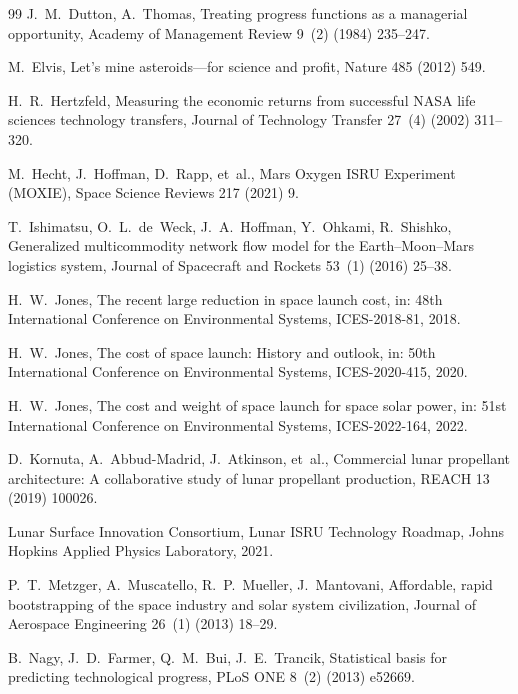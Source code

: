 \documentclass[preprint,12pt]{elsarticle}
\begin{document}
\begin{thebibliography}{99}
J.~M.~Dutton, A.~Thomas,
\newblock Treating progress functions as a managerial opportunity,
\newblock Academy of Management Review 9~(2) (1984) 235--247.

M.~Elvis,
\newblock Let's mine asteroids---for science and profit,
\newblock Nature 485 (2012) 549.

H.~R.~Hertzfeld,
\newblock Measuring the economic returns from successful NASA life sciences technology transfers,
\newblock Journal of Technology Transfer 27~(4) (2002) 311--320.

M.~Hecht, J.~Hoffman, D.~Rapp, et~al.,
\newblock Mars Oxygen ISRU Experiment (MOXIE),
\newblock Space Science Reviews 217 (2021) 9.

T.~Ishimatsu, O.~L.~de~Weck, J.~A.~Hoffman, Y.~Ohkami, R.~Shishko,
\newblock Generalized multicommodity network flow model for the Earth--Moon--Mars logistics system,
\newblock Journal of Spacecraft and Rockets 53~(1) (2016) 25--38.

H.~W.~Jones,
\newblock The recent large reduction in space launch cost,
\newblock in: 48th International Conference on Environmental Systems, ICES-2018-81, 2018.

H.~W.~Jones,
\newblock The cost of space launch: History and outlook,
\newblock in: 50th International Conference on Environmental Systems, ICES-2020-415, 2020.

H.~W.~Jones,
\newblock The cost and weight of space launch for space solar power,
\newblock in: 51st International Conference on Environmental Systems, ICES-2022-164, 2022.

D.~Kornuta, A.~Abbud-Madrid, J.~Atkinson, et~al.,
\newblock Commercial lunar propellant architecture: A collaborative study of lunar propellant production,
\newblock REACH 13 (2019) 100026.

Lunar Surface Innovation Consortium,
\newblock Lunar ISRU Technology Roadmap,
\newblock Johns Hopkins Applied Physics Laboratory, 2021.

P.~T.~Metzger, A.~Muscatello, R.~P.~Mueller, J.~Mantovani,
\newblock Affordable, rapid bootstrapping of the space industry and solar system civilization,
\newblock Journal of Aerospace Engineering 26~(1) (2013) 18--29.

B.~Nagy, J.~D.~Farmer, Q.~M.~Bui, J.~E.~Trancik,
\newblock Statistical basis for predicting technological progress,
\newblock PLoS ONE 8~(2) (2013) e52669.


\end{thebibliography}
\end{document}
